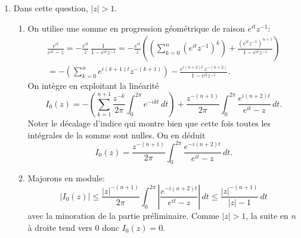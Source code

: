 \begin{enumerate}
 \item Dans cette question, $|z| > 1$.
\begin{enumerate}
 \item On utilise une somme en progression géométrique de raison $e^{it}z^{-1}$:
\begin{multline*}
 \frac{e^{it}}{e^{it} - z} = -\frac{e^{it}}{z}\,\frac{1}{1 - e^{it}z^{-1}}
 = -\frac{e^{it}}{z}\left( \left( \sum_{k=0}^{n}(e^{it}z^{-1})^k\right) + \frac{(e^{it}z^{-1})^{n+1}}{1 - e^{it}z^{-1}}\right) \\
 = -\left( \sum_{k=0}^{n}e^{i(k+1)t}z^{-(k+1)}\right) - \frac{e^{i(n+2)t}\,z^{-(n+2)}}{1 - e^{it}z^{-1}} .
\end{multline*}
On intègre en exploitant la linéarité
\[
I_0(z) = -\left( \sum_{k=1}^{n+1}\frac{z^{-k}}{2\pi}\int_0^{2\pi}e^{-ikt}\,dt\right) +  \frac{z^{-(n+1)}}{2\pi}\int_0^{2\pi}\frac{e^{i(n+2)t}}{e^{it} - z}\, dt.
\]
Noter le décalage d'indice qui montre bien que cette fois toutes les intégrales de la somme sont nulles. On en déduit
\[
I_0(z) = \frac{z^{-(n+1)}}{2\pi}\int_0^{2\pi}\frac{e^{-i(n+2)t}}{e^{it} - z}\, dt .
\]
 \item Majorons en module:
\[
 |I_0(z)| \leq \frac{|z|^{-(n+1)}}{2\pi}\int_0^{2\pi}\left|\frac{e^{-i(n+2)t}}{e^{it} - z}\right|\, dt
 \leq \frac{|z|^{-(n+1)}}{|z| - 1}\, dt
\]
avec la minoration de la partie préliminaire. Comme $|z|>1$, la suite en $n$ à droite tend vers $0$ donc $I_0(z)= 0$. 
\end{enumerate}

\end{enumerate}

